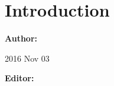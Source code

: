 \documentclass{WSLsop}{}
\begin{document}
	
\section{Introduction}



\textbf{Author:} \author{M. Larsen}{2016 Nov 03}

\textbf{Editor:} 

\end{document}
